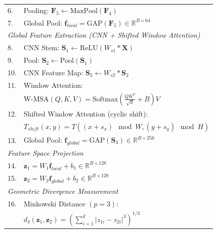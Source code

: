 \documentclass[preprint,12pt]{elsarticle}
\begin{document}
\begin{table}[h]
\begin{tabular}{@{}ll@{}}
6. & Pooling: $\mathbf{F}_5 \leftarrow \text{MaxPool}(\mathbf{F}_4)$ \\

7. & Global Pool: $\mathbf{f}_{local} = \text{GAP}(\mathbf{F}_5) \in \mathbb{R}^{B \times 64}$ \\

\midrule
\multicolumn{2}{l}{\textit{Global Feature Extraction (CNN + Shifted Window Attention)}} \\

8. & CNN Stem: $\mathbf{S}_1 \leftarrow \text{ReLU}(W_{s1} * \mathbf{X})$ \\

9. & Pool: $\mathbf{S}_2 \leftarrow \text{Pool}(\mathbf{S}_1)$ \\

10. & CNN Feature Map: $\mathbf{S}_3 \leftarrow W_{s2} * \mathbf{S}_2$ \\

11. & Window Attention: \\

 & \quad $\text{W-MSA}(Q,K,V) = \text{Softmax}\left(\frac{QK^T}{\sqrt{d}} + B\right)V$ \\

12. & Shifted Window Attention (cyclic shift): \\

 & \quad $T_{shift}(x,y) = T((x+s_x)\!\!\mod W,(y+s_y)\!\!\mod H)$ \\

13. & Global Pool: $\mathbf{f}_{global} = \text{GAP}(\mathbf{S}_3) \in \mathbb{R}^{B \times 256}$ \\

\midrule
\multicolumn{2}{l}{\textit{Feature Space Projection}} \\

14. & $\mathbf{z}_1 = W_1 \mathbf{f}_{local} + b_1 \in \mathbb{R}^{B \times 128}$ \\

15. & $\mathbf{z}_2 = W_2 \mathbf{f}_{global} + b_2 \in \mathbb{R}^{B \times 128}$ \\

\midrule
\multicolumn{2}{l}{\textit{Geometric Divergence Measurement}} \\

16. & Minkowski Distance $(p=3)$: \\

 & \quad $d_3(\mathbf{z}_1,\mathbf{z}_2) =
 \left(\sum_{i=1}^{d} |z_{1i}-z_{2i}|^3\right)^{1/3}$ \\


\end{tabular}
\end{table}
\end{document}
